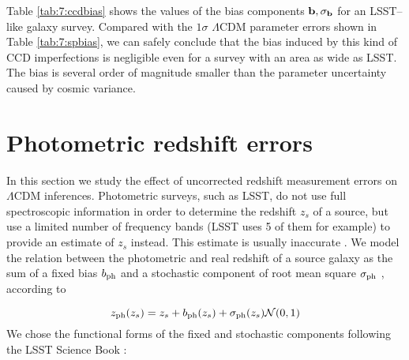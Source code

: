 %
Table \ref{tab:7:ccdbias} shows the values of the bias components $\mathbf{b},\sigma_{\mathbf{b}}$ for an LSST--like galaxy survey. Compared with the $1\sigma$ $\Lambda$CDM parameter errors shown in Table \ref{tab:7:spbias}, we can safely conclude that the bias induced by this kind of CCD imperfections is negligible even for a survey with an area as wide as LSST. The bias is several order of magnitude smaller than the parameter uncertainty caused by cosmic variance.  

\section{Photometric redshift errors}
\label{sec:7:photoz}
In this section we study the effect of uncorrected redshift measurement errors on $\Lambda$CDM inferences. Photometric surveys, such as LSST, do not use full spectroscopic information in order to determine the redshift $z_s$ of a source, but use a limited number of frequency bands (LSST uses 5 of them for example) to provide an estimate of $z_s$ instead. This estimate is usually inaccurate \citep{LSSTSciBook}. We model the relation between the photometric and real redshift of a source galaxy as the sum of a fixed bias $b_{\rm ph}$ and a stochastic component of root mean square $\sigma_{\rm ph}$ \citep{PetriPhotoZ,LSSTSciBook}, according to  

\begin{equation}
\label{eq:7:phreal}
z_{\rm ph}(z_s) = z_s + b_{\rm ph}(z_s) + \sigma_{\rm ph}(z_s)\mathcal{N}(0,1)
\end{equation}
%
We chose the functional forms of the fixed and stochastic components following the LSST Science Book \citep{LSSTSciBook}: 

